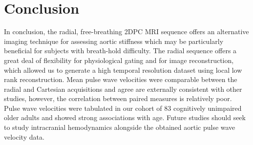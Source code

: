 \section{Conclusion}\label{sec:life_conclusion}
In conclusion, the radial, free-breathing 2DPC MRI sequence offers an alternative imaging technique for assessing aortic stiffness which may be particularly beneficial for subjects with breath-hold difficulty. The radial sequence offers a great deal of flexibility for physiological gating and for image reconstruction, which allowed us to generate a high temporal resolution dataset using local low rank reconstruction. Mean pulse wave velocities were comparable between the radial and Cartesian acquisitions and agree are externally consistent with other studies, however, the correlation between paired measures is relatively poor. Pulse wave velocities were tabulated in our cohort of 83 cognitively unimpaired older adults and showed strong associations with age. Future studies should seek to study intracranial hemodynamics alongside the obtained aortic pulse wave velocity data.

